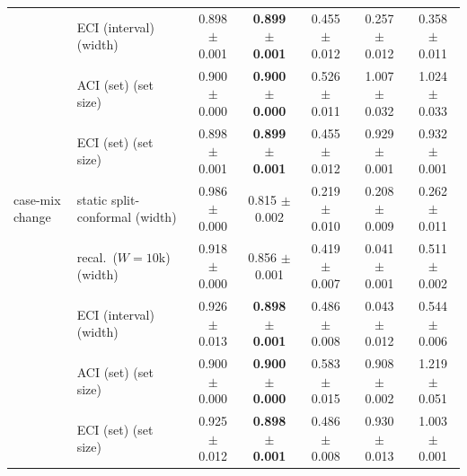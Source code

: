 \begin{table}[t]
{\begin{tabular}{llccccc}
 & ECI (interval) (width) & 0.898 $\pm$ 0.001 & \textbf{0.899 $\pm$ 0.001} & 0.455 $\pm$ 0.012 & 0.257 $\pm$ 0.012 & 0.358 $\pm$ 0.011 \\
 & ACI (set) (set size) & 0.900 $\pm$ 0.000 & \textbf{0.900 $\pm$ 0.000} & 0.526 $\pm$ 0.011 & 1.007 $\pm$ 0.032 & 1.024 $\pm$ 0.033 \\
 & ECI (set) (set size) & 0.898 $\pm$ 0.001 & \textbf{0.899 $\pm$ 0.001} & 0.455 $\pm$ 0.012 & 0.929 $\pm$ 0.001 & 0.932 $\pm$ 0.001 \\
\midrule
case-mix change & static split-conformal (width) & 0.986 $\pm$ 0.000 & 0.815 $\pm$ 0.002 & 0.219 $\pm$ 0.010 & 0.208 $\pm$ 0.009 & 0.262 $\pm$ 0.011 \\
 & recal.\ ($W{=}10$k) (width) & 0.918 $\pm$ 0.000 & 0.856 $\pm$ 0.001 & 0.419 $\pm$ 0.007 & 0.041 $\pm$ 0.001 & 0.511 $\pm$ 0.002 \\
 & ECI (interval) (width) & 0.926 $\pm$ 0.013 & \textbf{0.898 $\pm$ 0.001} & 0.486 $\pm$ 0.008 & 0.043 $\pm$ 0.012 & 0.544 $\pm$ 0.006 \\
 & ACI (set) (set size) & 0.900 $\pm$ 0.000 & \textbf{0.900 $\pm$ 0.000} & 0.583 $\pm$ 0.015 & 0.908 $\pm$ 0.002 & 1.219 $\pm$ 0.051 \\
 & ECI (set) (set size) & 0.925 $\pm$ 0.012 & \textbf{0.898 $\pm$ 0.001} & 0.486 $\pm$ 0.008 & 0.930 $\pm$ 0.013 & 1.003 $\pm$ 0.001 \\
\bottomrule
\end{tabular}%
}
\end{table}
